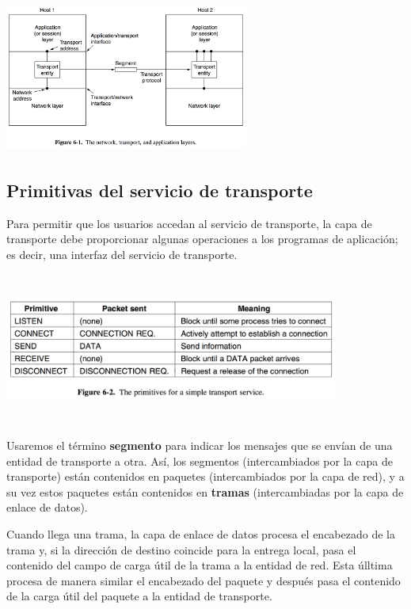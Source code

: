 \documentclass[10pt,a4paper]{report}
\begin{document}
	\begin{center}
	\includegraphics[width=8cm, height=5cm]{./imagenes/transporte.png} 
	\end{center}

\subsection{Primitivas del servicio de transporte}


\par Para permitir que los usuarios accedan al servicio de transporte, la capa de 
transporte debe proporcionar algunas operaciones a los programas de aplicación; es 
decir, una interfaz del servicio de transporte.

\begin{center}
	\includegraphics[width=11cm, height=5cm]{./imagenes/primitivas.png} 
\end{center}

\par Usaremos el término \textbf{segmento} para indicar los mensajes que se envían 
de una entidad de transporte a otra. Así, los segmentos (intercambiados por la capa 
de transporte) están contenidos en paquetes (intercambiados por la capa de red), y a 
su vez estos paquetes están contenidos en \textbf{tramas} (intercambiadas por la 
capa de enlace de datos).
\par Cuando llega una trama, la capa de enlace de datos procesa el encabezado de la 
trama y, si la dirección de destino coincide para la entrega local, pasa el contenido del 
campo de carga útil de la trama a la entidad de red. Esta úlltima procesa de manera 
similar el encabezado del paquete y después pasa el contenido de la carga útil del 
paquete a la entidad de transporte. 
\end{document}
